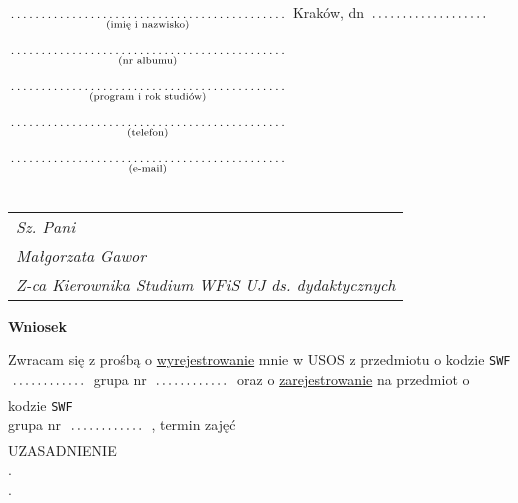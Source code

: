 \documentclass[a4paper,11pt]{article}
\newcommand{\fillField}[2]{
    $\underset{\text{#1}}{\parbox[t]{#2}{\dotfill}}$
}
\begin{document}
\noindent
\fillField{(imię i nazwisko)}{7cm} \hfill Kraków, dn\fillField{}{3cm} \\\\
\fillField{(nr albumu)}{7cm} \\\\
\fillField{(program i rok studiów)}{7cm} \\\\
\fillField{(telefon)}{7cm} \\\\
\fillField{(e-mail)}{7cm} \\\\

\phantom{a}\hfill
\begin{tabular}[c]{@{}l@{}}
\textit{Sz. Pani} \\
\textit{Małgorzata Gawor}\\
\textit{Z-ca Kierownika Studium WFiS UJ ds. dydaktycznych}
\end{tabular}

\vskip 1.5cm

\begin{center}
{\Large \textbf{Wniosek}}
\end{center}

\vskip 0.5cm

Zwracam się z prośbą o \underline{wyrejestrowanie} mnie w USOS z przedmiotu
o kodzie \texttt{SWF}\fillField{}{2cm} grupa nr \fillField{}{2cm} oraz o
\underline{zarejestrowanie} na przedmiot o kodzie \texttt{SWF}\dotfill\\
grupa nr \fillField{}{2cm}, termin zajęć \dotfill\\

\noindent
UZASADNIENIE \dotfill\\
.\dotfill\\
.\dotfill\\

\end{document}
